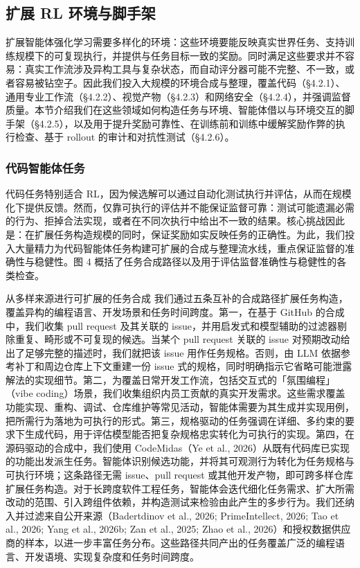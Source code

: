 \documentclass[
  10
]{article}
\begin{document}
\subsection{扩展 RL 环境与脚手架}\label{scaling-rl-environments-and-harnesses}

扩展智能体强化学习需要多样化的环境：这些环境要能反映真实世界任务、支持训练规模下的可复现执行，并提供与任务目标一致的奖励。同时满足这些要求并不容易：真实工作流涉及异构工具与复杂状态，而自动评分器可能不完整、不一致，或者容易被钻空子。因此我们投入大规模的环境合成与整理，覆盖代码（§4.2.1）、通用专业工作流（§4.2.2）、视觉产物（§4.2.3）和网络安全（§4.2.4），并强调监督质量。本节介绍我们在这些领域如何构造任务与环境、智能体借以与环境交互的脚手架（§4.2.5），以及用于提升奖励可靠性、在训练前和训练中缓解奖励作弊的执行检查、基于 rollout 的审计和对抗性测试（§4.2.6）。

\subsubsection{代码智能体任务}\label{code-agent-tasks}

代码任务特别适合 RL，因为候选解可以通过自动化测试执行并评估，从而在规模化下提供反馈。然而，仅靠可执行的评估并不能保证监督可靠：测试可能遗漏必需的行为、拒掉合法实现，或者在不同次执行中给出不一致的结果。核心挑战因此是：在扩展任务构造规模的同时，保证奖励如实反映任务的正确性。为此，我们投入大量精力为代码智能体任务构建可扩展的合成与整理流水线，重点保证监督的准确性与稳健性。图 4 概括了任务合成路径以及用于评估监督准确性与稳健性的各类检查。

从多样来源进行可扩展的任务合成 我们通过五条互补的合成路径扩展任务构造，覆盖异构的编程语言、开发场景和任务时间跨度。第一，在基于 GitHub 的合成中，我们收集 pull request 及其关联的 issue，并用启发式和模型辅助的过滤器剔除重复、畸形或不可复现的候选。当某个 pull request 关联的 issue 对预期改动给出了足够完整的描述时，我们就把该 issue 用作任务规格。否则，由 LLM 依据参考补丁和周边仓库上下文重建一份 issue 式的规格，同时明确指示它省略可能泄露解法的实现细节。第二，为覆盖日常开发工作流，包括交互式的「氛围编程」（vibe coding）场景，我们收集组织内员工贡献的真实开发需求。这些需求覆盖功能实现、重构、调试、仓库维护等常见活动，智能体需要为其生成并实现用例，把所需行为落地为可执行的形式。第三，规格驱动的任务强调在详细、多约束的要求下生成代码，用于评估模型能否把复杂规格忠实转化为可执行的实现。第四，在源码驱动的合成中，我们使用 CodeMidas（Ye et al., 2026）从既有代码库已实现的功能出发派生任务。智能体识别候选功能，并将其可观测行为转化为任务规格与可执行环境；这条路径无需 issue、pull request 或其他开发产物，即可跨多样仓库扩展任务构造。对于长跨度软件工程任务，智能体会迭代细化任务需求、扩大所需改动的范围、引入跨组件依赖，并构造测试来检验由此产生的多步行为。我们还纳入并过滤来自公开来源（Badertdinov et al., 2026; PrimeIntellect, 2026; Tao et al., 2026; Yang et al., 2026b; Zan et al., 2025; Zhao et al., 2026）和授权数据供应商的样本，以进一步丰富任务分布。这些路径共同产出的任务覆盖广泛的编程语言、开发语境、实现复杂度和任务时间跨度。
\end{document}
